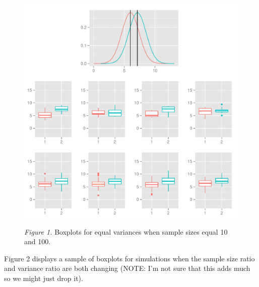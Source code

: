 \documentclass[man,a4paper,noextraspace,apacite]{apa6}\usepackage[]{graphicx}\usepackage[]{color}
\makeatletter
\def\maxwidth{ %
  \ifdim\Gin@nat@width>\linewidth
    \linewidth
  \else
    \Gin@nat@width
  \fi
}
\newenvironment{knitrout}{}{} %
\makeatother
\begin{document}
\begin{figure}
\begin{knitrout}
\color{fgcolor}
\includegraphics[width=\maxwidth]{figure/varEqualBoxplots} 

\end{knitrout}
\textit{Figure 1.} Boxplots for equal variances when sample sizes equal 10 and 100.
\end{figure}

Figure 2 displays a sample of boxplots for simulations when the sample size ratio and variance ratio are both changing (NOTE: I'm not sure that this adds much so we might just drop it).
\end{document}
